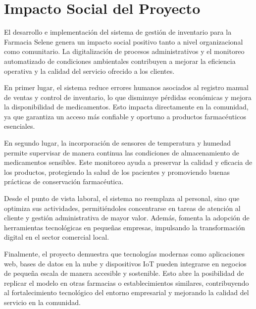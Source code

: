 \section*{Impacto Social del Proyecto}

El desarrollo e implementación del sistema de gestión de inventario para la Farmacia Selene genera un impacto social positivo tanto a nivel organizacional como comunitario. La digitalización de procesos administrativos y el monitoreo automatizado de condiciones ambientales contribuyen a mejorar la eficiencia operativa y la calidad del servicio ofrecido a los clientes.

En primer lugar, el sistema reduce errores humanos asociados al registro manual de ventas y control de inventario, lo que disminuye pérdidas económicas y mejora la disponibilidad de medicamentos. Esto impacta directamente en la comunidad, ya que garantiza un acceso más confiable y oportuno a productos farmacéuticos esenciales.

En segundo lugar, la incorporación de sensores de temperatura y humedad permite supervisar de manera continua las condiciones de almacenamiento de medicamentos sensibles. Este monitoreo ayuda a preservar la calidad y eficacia de los productos, protegiendo la salud de los pacientes y promoviendo buenas prácticas de conservación farmacéutica.

Desde el punto de vista laboral, el sistema no reemplaza al personal, sino que optimiza sus actividades, permitiéndoles concentrarse en tareas de atención al cliente y gestión administrativa de mayor valor. Además, fomenta la adopción de herramientas tecnológicas en pequeñas empresas, impulsando la transformación digital en el sector comercial local.

Finalmente, el proyecto demuestra que tecnologías modernas como aplicaciones web, bases de datos en la nube y dispositivos IoT pueden integrarse en negocios de pequeña escala de manera accesible y sostenible. Esto abre la posibilidad de replicar el modelo en otras farmacias o establecimientos similares, contribuyendo al fortalecimiento tecnológico del entorno empresarial y mejorando la calidad del servicio en la comunidad.